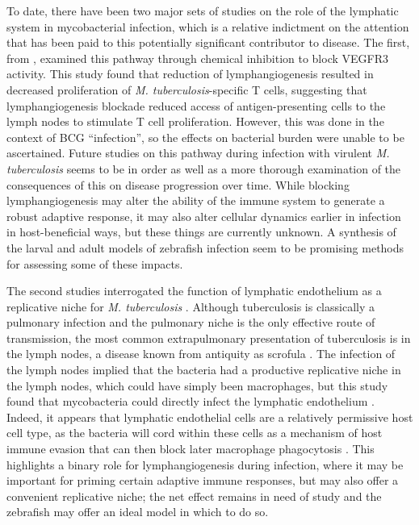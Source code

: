 To date, there have been two major sets of studies on the role of the lymphatic system in mycobacterial infection, which is a relative indictment on the attention that has been paid to this potentially significant contributor to disease. The first, from \citet{Harding2015}, examined this pathway through chemical inhibition to block VEGFR3 activity. This study found that reduction of lymphangiogenesis resulted in decreased proliferation of \textit{M. tuberculosis}\hyp{}specific T cells, suggesting that lymphangiogenesis blockade reduced access of antigen\hyp{}presenting cells to the lymph nodes to stimulate T cell proliferation. However, this was done in the context of BCG ``infection'', so the effects on bacterial burden were unable to be ascertained. Future studies on this pathway during infection with virulent \textit{M. tuberculosis} seems to be in order as well as a more thorough examination of the consequences of this on disease progression over time. While blocking lymphangiogenesis may alter the ability of the immune system to generate a robust adaptive response, it may also alter cellular dynamics earlier in infection in host\hyp{}beneficial ways, but these things are currently unknown. A synthesis of the larval and adult models of zebrafish infection seem to be promising methods for assessing some of these impacts.

The second studies interrogated the function of lymphatic endothelium as a replicative niche for \textit{M. tuberculosis} \citep{Lerner2016, Lerner2020}. Although tuberculosis is classically a pulmonary infection and the pulmonary niche is the only effective route of transmission, the most common extrapulmonary presentation of tuberculosis is in the lymph nodes, a disease known from antiquity as scrofula \citep{Bloch1973}. The infection of the lymph nodes implied that the bacteria had a productive replicative niche in the lymph nodes, which could have simply been macrophages, but this study found that mycobacteria could directly infect the lymphatic endothelium \citep{Lerner2016}. Indeed, it appears that lymphatic endothelial cells are a relatively permissive host cell type, as the bacteria will cord within these cells as a mechanism of host immune evasion that can then block later macrophage phagocytosis \citep{Lerner2020}. This highlights a binary role for lymphangiogenesis during infection, where it may be important for priming certain adaptive immune responses, but may also offer a convenient replicative niche; the net effect remains in need of study and the zebrafish may offer an ideal model in which to do so.

